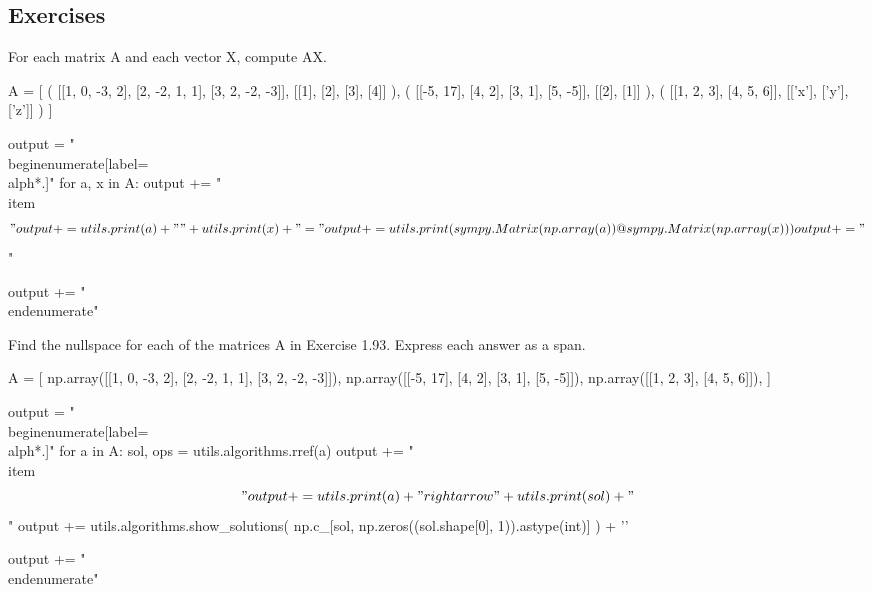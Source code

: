\documentclass[letterpaper]{article}
\newenvironment{question}[2][Question]{\begin{trivlist}
\item[\hskip \labelsep {\bfseries #1}\hskip \labelsep {\bfseries #2.}]}{\end{trivlist}}
\begin{document}
\subsection{Exercises}

\begin{question}{1.93}
    For each matrix A and each vector X, compute AX.

    \begin{pycode}
A = [
    (
        [[1, 0, -3, 2], [2, -2, 1, 1], [3, 2, -2, -3]],
        [[1], [2], [3], [4]]
    ),
    (
        [[-5, 17], [4, 2], [3, 1], [5, -5]],
        [[2], [1]]
    ),
    (
        [[1, 2, 3], [4, 5, 6]],
        [['x'], ['y'], ['z']]
    )
]

output = "\\begin{enumerate}[label=\\alph*.]"
for a, x in A:
    output += "\n \\item $$"
    output += utils.print(a) + " " + utils.print(x) + " = "
    output += utils.print(
        sympy.Matrix(np.array(a)) @ sympy.Matrix(np.array(x))
    )
    output += " $$ \n"

output += "\\end{enumerate}"

    \end{pycode}


\end{question}

\begin{question}{1.96}
    Find the nullspace for each of the matrices A in Exercise 1.93. 
    Express each answer as a span.


    \begin{pycode}
A = [
    np.array([[1, 0, -3, 2], [2, -2, 1, 1], [3, 2, -2, -3]]),
    np.array([[-5, 17], [4, 2], [3, 1], [5, -5]]),
    np.array([[1, 2, 3], [4, 5, 6]]),
]

output = "\\begin{enumerate}[label=\\alph*.]"
for a in A:
    sol, ops = utils.algorithms.rref(a)
    output += "\n \\item $$"
    output += utils.print(a) + " \\rightarrow " + utils.print(sol) + "$$"
    output += utils.algorithms.show_solutions(
        np.c_[sol, np.zeros((sol.shape[0], 1)).astype(int)]
        ) + '\n'

output += "\\end{enumerate}"
    \end{pycode}

    
\end{question}
\end{document}
